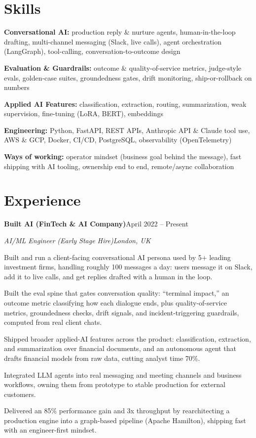 \documentclass[10pt,a4paper]{article}
\newcommand{\entry}[4]{%
  {\color{company}\bfseries #1}\hfill {\color{muted}#2}\par
  \vspace{1pt}
  {\itshape #3}\hfill {\color{muted}\itshape #4}\par
  \vspace{3pt}%
}
\begin{document}
\section{Skills}
\begin{tight}
  \item[\textcolor{accent}{\small$\bullet$}] \textbf{Conversational AI:} production reply \& nurture agents, human-in-the-loop drafting, multi-channel messaging (Slack, live calls), agent orchestration (LangGraph), tool-calling, conversation-to-outcome design
  \item[\textcolor{accent}{\small$\bullet$}] \textbf{Evaluation \& Guardrails:} outcome \& quality-of-service metrics, judge-style evals, golden-case suites, groundedness gates, drift monitoring, ship-or-rollback on numbers
  \item[\textcolor{accent}{\small$\bullet$}] \textbf{Applied AI Features:} classification, extraction, routing, summarization, weak supervision, fine-tuning (LoRA, BERT), embeddings
  \item[\textcolor{accent}{\small$\bullet$}] \textbf{Engineering:} Python, FastAPI, REST APIs, Anthropic API \& Claude tool use, AWS \& GCP, Docker, CI/CD, PostgreSQL, observability (OpenTelemetry)
  \item[\textcolor{accent}{\small$\bullet$}] \textbf{Ways of working:} operator mindset (business goal behind the message), fast shipping with AI tooling, ownership end to end, remote/async collaboration
\end{tight}

\section{Experience}
\entry{Built AI (FinTech \& AI Company)}{April 2022 -- Present}{AI/ML Engineer (Early Stage Hire)}{London, UK}
\begin{tight}
  \item Built and run a client-facing conversational AI persona used by 5+ leading investment firms, handling roughly 100 messages a day: users message it on Slack, add it to live calls, and get replies drafted with a human in the loop.
  \item Built the eval spine that gates conversation quality: ``terminal impact,'' an outcome metric classifying how each dialogue ends, plus quality-of-service metrics, groundedness checks, drift signals, and incident-triggering guardrails, computed from real client chats.
  \item Shipped broader applied-AI features across the product: classification, extraction, and summarization over financial documents, and an autonomous agent that drafts financial models from raw data, cutting analyst time 70\%.
  \item Integrated LLM agents into real messaging and meeting channels and business workflows, owning them from prototype to stable production for external customers.
  \item Delivered an 85\% performance gain and 3x throughput by rearchitecting a production engine into a graph-based pipeline (Apache Hamilton), shipping fast with an engineer-first mindset.
\end{tight}
\end{document}
